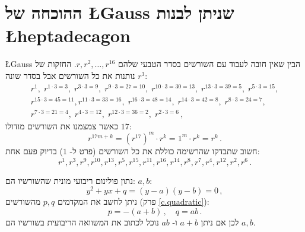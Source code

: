 \section{ההוכחה של 
\L{\normalsize Gauss}
שניתן לבנות 
\L{heptadecagon}}\label{s.gauss}

\L{Gauss}
הבין שאין חובה לעבוד עם השורשים בסדר הטבעי שלהם
$r,r^2,\ldots,r^{16}$. 
החזקות של
$r^3$
נותנות את כל השורשים אבל בסדר שונה:
\[
\renewcommand{\arraystretch}{1.1}
\begin{array}{l}
r^1, \;r^{1\cdot 3 =3},\; r^{3\cdot 3=9},\; r^{9\cdot 3=27=10},\; r^{10\cdot 3=30=13},\; r^{13\cdot 3=39=5},\; r^{5\cdot 3=15},\\ r^{15\cdot 3=45=11},
r^{11\cdot 3 =33=16}, \;r^{16\cdot 3=48=14},\; r^{14\cdot 3=42=8},\; r^{8\cdot 3=24=7},\\r^{7\cdot 3=21=4},\; r^{4\cdot 3=12},\; r^{12\cdot 3=36=2},\; r^{2\cdot 3=6}\,,
\end{array}
\]
כאשר צמצמנו את השורשים מודולו
$17$:
\[
r^{17m+k}=(r^{17})^m\cdot r^k=1^m\cdot r^k=r^k\,.
\]
חשוב שתבדקו שהרשימה כוללת את כל השורשים  (פרט ל-%
$1$)
בדיוק פעם אחת:
\begin{equation}\label{eq.roots}
r^1, r^3, r^9, r^{10}, r^{13}, r^5, r^{15}, r^{11}, r^{16}, r^{14}, r^8, r^7, r^4, r^{12}, r^2, r^6\,.
\end{equation}

נתון פולינום ריבועי מונית שהשורשיו הם:
$a,b$:
\[
y^2+yx+q=(y-a)(y-b)=0\,,
\]
ניתן לחשב את המקדמים
$p,	q$
מהשורשים
(פרק%
\ref{c.quadratic}):
\[
p=-(a+b)\,,\quad q=ab\,.
\]
לכן אם ניתן 
$a+b$
ו-%
$ab$
נוכל לכתוב את המשוואה הריבועית בשורשיו הם
$a,b$.


